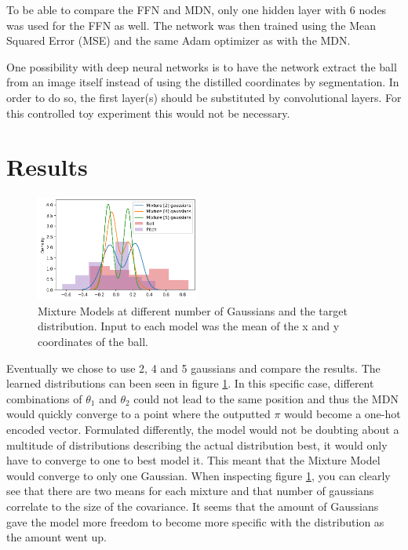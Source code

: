 \documentclass{article}
\begin{document}
    To be able to compare the FFN and MDN, only one hidden layer with 6 nodes was used for the FFN as well.
    The network was then trained using the Mean Squared Error (MSE) and the same Adam optimizer as with the MDN.

    One possibility with deep neural networks is to have the network extract the ball from an image itself instead of using the distilled coordinates by segmentation. 
    In order to do so, the first layer(s) should be substituted by convolutional layers.
    For this controlled toy experiment this would not be necessary.


    \section{Results}\label{sec:results}
    \begin{figure}
        \begin{center}
          \includegraphics[trim=0 0 0 23pt,width=0.48\textwidth]{../part2/20kepochs_distr.png}
        \end{center}
        \caption{Mixture Models at different number of Gaussians and the target distribution. Input to each model was the mean of the x and y coordinates of the ball.}
        \label{fig:learned-mix-model}
        \vspace{15pt}
    \end{figure}

    Eventually we chose to use 2, 4 and 5 gaussians and compare the results.
    The learned distributions can been seen in figure \ref{fig:learned-mix-model}.
    In this specific case, different combinations of $\theta_1$ and $\theta_2$ could not lead to the same position and thus the MDN would quickly converge to a point where the outputted $\pi$ would become a one-hot encoded vector. 
    Formulated differently, the model would not be doubting about a multitude of distributions describing the actual distribution best, it would only have to converge to one to best model it. 
    This meant that the Mixture Model would converge to only one Gaussian.
    When inspecting figure \ref{fig:learned-mix-model}, you can clearly see that there are two means for each mixture and that number of gaussians correlate to the size of the covariance.
    It seems that the amount of Gaussians gave the model more freedom to become more specific with the distribution as the amount went up.
\end{document}
